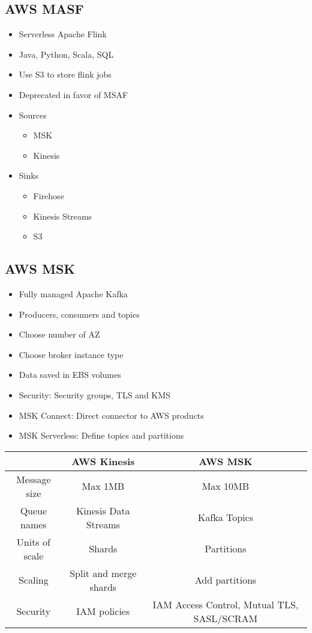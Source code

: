 \documentclass[../../main.tex]{subfiles}
\begin{document}
\subsection{AWS MASF}
\begin{itemize}
    \item Serverless Apache Flink
    \item Java, Python, Scala, SQL
    \item Use S3 to store flink jobs
    \item Deprecated in favor of MSAF
    \item Sources
    \begin{itemize}
        \item MSK
        \item Kinesis
    \end{itemize}
    \item Sinks
    \begin{itemize}
        \item Firehose
        \item Kinesis Streams
        \item S3
    \end{itemize}
\end{itemize}

\subsection{AWS MSK}
\begin{itemize}
    \item Fully managed Apache Kafka
    \item Producers, consumers and topics
    \item Choose number of AZ
    \item Choose broker instance type
    \item Data saved in EBS volumes
    \item Security: Security groups, TLS and KMS
    \item MSK Connect: Direct connector to AWS products
    \item MSK Serverless: Define topics and partitions
\end{itemize}

\begin{center}
    \begin{tabular}{ |c|c|c| }
    \hline
    & AWS Kinesis & AWS MSK \\
    \hline
    Message size & Max 1MB & Max 10MB \\
    \hline
    Queue names & Kinesis Data Streams & Kafka Topics \\
    \hline
    Units of scale & Shards & Partitions \\
    \hline
    Scaling & Split and merge shards & Add partitions \\
    \hline
    Security & IAM policies & IAM Access Control, Mutual TLS, SASL/SCRAM \\
    \hline
    \end{tabular}
\end{center}
\end{document}
